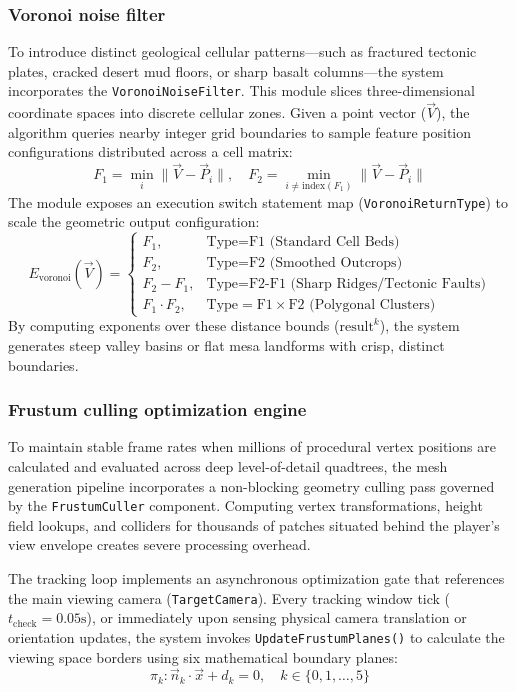 \documentclass[12pt]{report}
\begin{document}
\subsubsection{Voronoi noise filter}
To introduce distinct geological cellular patterns---such as fractured tectonic plates, cracked desert mud floors, or sharp basalt columns---the system incorporates the \texttt{VoronoiNoiseFilter}. This module slices three-dimensional coordinate spaces into discrete cellular zones. Given a point vector ($\vec{V}$), the algorithm queries nearby integer grid boundaries to sample feature position configurations distributed across a cell matrix:
\begin{equation}
F_1 = \min_{i} \|\vec{V} - \vec{P}_i\|, \quad F_2 = \min_{i \neq \text{index}(F_1)} \|\vec{V} - \vec{P}_i\|
\end{equation}
The module exposes an execution switch statement map (\texttt{VoronoiReturnType}) to scale the geometric output configuration:
\begin{equation}
E_{\text{voronoi}}(\vec{V}) = \begin{cases} 
F_1, & \text{Type} = \text{F1 (Standard Cell Beds)} \\
F_2, & \text{Type} = \text{F2 (Smoothed Outcrops)} \\
F_2 - F_1, & \text{Type} = \text{F2-F1 (Sharp Ridges/Tectonic Faults)} \\
F_1 \cdot F_2, & \text{Type} = \text{F1}\times\text{F2 (Polygonal Clusters)}
\end{cases}
\end{equation}
By computing exponents over these distance bounds ($\text{result}^k$), the system generates steep valley basins or flat mesa landforms with crisp, distinct boundaries.

\subsubsection{Frustum culling optimization engine}
To maintain stable frame rates when millions of procedural vertex positions are calculated and evaluated across deep level-of-detail quadtrees, the mesh generation pipeline incorporates a non-blocking geometry culling pass governed by the \texttt{FrustumCuller} component. Computing vertex transformations, height field lookups, and colliders for thousands of patches situated behind the player's view envelope creates severe processing overhead. 

The tracking loop implements an asynchronous optimization gate that references the main viewing camera (\texttt{TargetCamera}). Every tracking window tick ($t_{\text{check}} = 0.05\text{s}$), or immediately upon sensing physical camera translation or orientation updates, the system invokes \texttt{UpdateFrustumPlanes()} to calculate the viewing space borders using six mathematical boundary planes:
\begin{equation}
\pi_k: \vec{n}_k \cdot \vec{x} + d_k = 0, \quad k \in \{0, 1, \ldots, 5\}
\end{equation}
\end{document}
